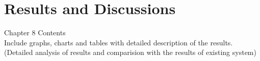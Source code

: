 
\chapter{Results and Discussions}\thispagestyle{thesisstyle} %
\graphicspath{{Chapter6/}}
{

Chapter 8 Contents\\
Include graphs, charts and tables with detailed description of the results.
(Detailed analysis of results and comparision with the results of existing system)


















}


